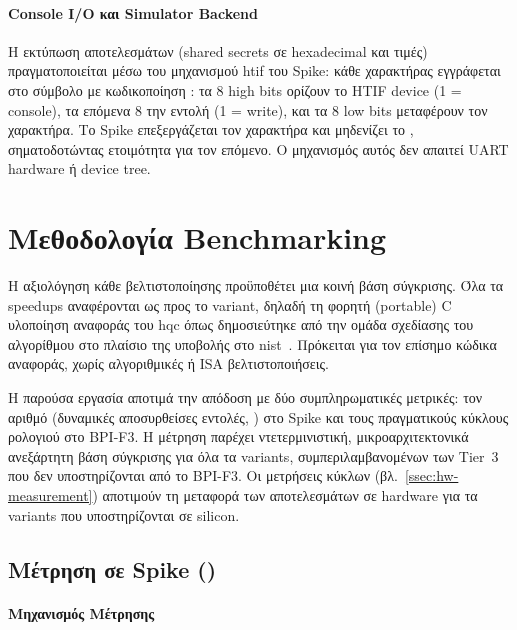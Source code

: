 \paragraph{Console I/O και Simulator Backend}

Η εκτύπωση αποτελεσμάτων (shared secrets σε hexadecimal και \instret τιμές)
πραγματοποιείται μέσω του μηχανισμού \gls{htif} του Spike: κάθε χαρακτήρας
εγγράφεται στο σύμβολο  με κωδικοποίηση
: τα \num{8} high bits ορίζουν το HTIF 
device (\num{1} = console), τα επόμενα \num{8} την εντολή 
(\num{1} = write), και τα \num{8} low bits μεταφέρουν τον χαρακτήρα. 
Το Spike επεξεργάζεται τον χαρακτήρα και μηδενίζει το , 
σηματοδοτώντας ετοιμότητα για τον επόμενο. Ο μηχανισμός αυτός δεν απαιτεί 
UART hardware ή device tree.

\section{Μεθοδολογία Benchmarking}
\label{sec:benchmarking}

\label{conv:baseline}%
Η αξιολόγηση κάθε βελτιστοποίησης προϋποθέτει μια κοινή βάση σύγκρισης. 
Όλα τα speedups αναφέρονται ως προς το  variant, 
δηλαδή τη φορητή (portable) C υλοποίηση αναφοράς του \gls{hqc} όπως 
δημοσιεύτηκε από την ομάδα σχεδίασης του αλγορίθμου στο πλαίσιο της 
υποβολής στο \gls{nist}~\cite{HQC-reference-impl}. Πρόκειται για τον 
επίσημο κώδικα αναφοράς, χωρίς αλγοριθμικές ή ISA βελτιστοποιήσεις. 

Η παρούσα εργασία αποτιμά την απόδοση με δύο συμπληρωματικές μετρικές: 
τον αριθμό  (δυναμικές αποσυρθείσες 
εντολές, \instret) στο Spike και τους πραγματικούς κύκλους ρολογιού 
στο BPI-F3. Η μέτρηση \instret παρέχει ντετερμινιστική, μικροαρχιτεκτονικά 
ανεξάρτητη βάση σύγκρισης για όλα τα variants, συμπεριλαμβανομένων των 
Tier~3 που δεν υποστηρίζονται από το BPI-F3. Οι μετρήσεις κύκλων 
(βλ.\ \cref{ssec:hw-measurement}) αποτιμούν τη μεταφορά των αποτελεσμάτων 
σε hardware για τα variants που υποστηρίζονται σε silicon.

\subsection{Μέτρηση σε Spike (\instret)}
\label{ssec:spike-measurement}

\paragraph{Μηχανισμός Μέτρησης}

